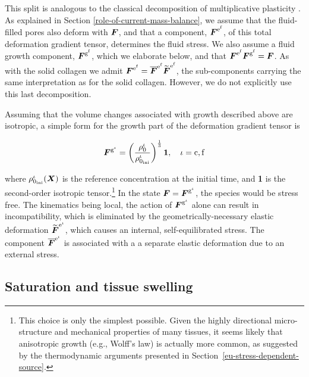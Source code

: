 This split is analogous to the classical decomposition of
multiplicative plasticity \citep{Bilbyetal:1956,Lee:1969}. As
explained in Section \ref{role-of-current-mass-balance}, we assume
that the fluid-filled pores also deform with $\mbox{\boldmath$ F$}$, and that a
component, $\mbox{\boldmath$ F$}^{\mathrm{e}^\mathrm{f}}$, of this total deformation
gradient tensor, determines the fluid stress. We also assume a fluid
growth component, $\mbox{\boldmath$ F$}^{\mathrm{g}^\mathrm{f}}$, which we elaborate
below, and that
$\mbox{\boldmath$ F$}^{\mathrm{e}^\mathrm{f}}\mbox{\boldmath$ F$}^{\mathrm{g}^\mathrm{f}} = \mbox{\boldmath$ F$}$. As
with the solid collagen we admit $\mbox{\boldmath$ F$}^{\mathrm{e}^\mathrm{f}} =
\overline{\mbox{\boldmath$ F$}}^{\mathrm{e}^\mathrm{f}}
\widetilde{\mbox{\boldmath$ F$}}^{\mathrm{e}^\mathrm{f}}$, the sub-components carrying
the same interpretation as for the solid collagen. However, we do not
explicitly use this last decomposition.

Assuming that the volume changes associated with growth described
above are isotropic, a simple form for the growth part of the
deformation gradient tensor is

\begin{equation}
\mbox{\boldmath$ F$}^{\mathrm{g}^\iota} = \left(
  \frac{\rho_0^\iota}{\rho_{0_{\mathrm{ini}}}^\iota} \right)^
  {\frac{1}{3}} 
{\bf 1},\quad \iota = \mathrm{c,f}
\label{isotropicgrowth} 
\end{equation} 

\noindent where $\rho_{0_{\mathrm{ini}}}^\iota(\mbox{\boldmath$ X$})$ is the reference
concentration at the initial time, and {\bf 1} is the second-order
isotropic tensor.\footnote{This choice is only the simplest
  possible. Given the highly directional micro-structure and
  mechanical properties of many tissues, it seems likely that
  anisotropic growth (e.g., Wolff's law) is actually more common, as
  suggested by the thermodynamic arguments presented in
  Section~\ref{eu-stress-dependent-source}.} In the state $\mbox{\boldmath$ F$} =
\mbox{\boldmath$ F$}^{\mathrm{g}^\iota}$, the species would be stress free. The
kinematics being local, the action of $\mbox{\boldmath$ F$}^{\mathrm{g}^\iota}$ alone
can result in incompatibility, which is eliminated by the
geometrically-necessary elastic deformation
$\widetilde{\mbox{\boldmath$ F$}}^{\mathrm{e}^{\mathrm{\iota}}}$, which causes an
internal, self-equilibrated stress. The component
$\overline{\mbox{\boldmath$ F$}}^{\mathrm{e}^\iota}$ is associated with a a separate
elastic deformation due to an external stress.

\subsection{Saturation and tissue swelling}
\label{saturation-and-swelling}

